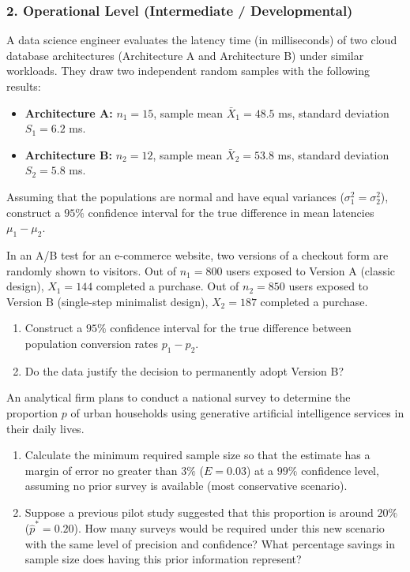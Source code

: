 \subsubsection*{2. Operational Level (Intermediate / Developmental)}

\begin{problema}
	\label{prob:dif_medias_indep_iguales}
	A data science engineer evaluates the latency time (in milliseconds) of two cloud database architectures (Architecture A and Architecture B) under similar workloads. They draw two independent random samples with the following results:
	\begin{itemize}
		\item \textbf{Architecture A:} $n_1 = 15$, sample mean $\bar{X}_1 = 48.5$ ms, standard deviation $S_1 = 6.2$ ms.
		\item \textbf{Architecture B:} $n_2 = 12$, sample mean $\bar{X}_2 = 53.8$ ms, standard deviation $S_2 = 5.8$ ms.
	\end{itemize}
	Assuming that the populations are normal and have equal variances ($\sigma_1^2 = \sigma_2^2$), construct a $95\%$ confidence interval for the true difference in mean latencies $\mu_1 - \mu_2$.
\end{problema}

\begin{problema}
	\label{prob:dif_proporciones_ab}
	In an A/B test for an e-commerce website, two versions of a checkout form are randomly shown to visitors. Out of $n_1 = 800$ users exposed to Version A (classic design), $X_1 = 144$ completed a purchase. Out of $n_2 = 850$ users exposed to Version B (single-step minimalist design), $X_2 = 187$ completed a purchase.
	\begin{enumerate}
		\item Construct a $95\%$ confidence interval for the true difference between population conversion rates $p_1 - p_2$.
		\item Do the data justify the decision to permanently adopt Version B?
	\end{enumerate}
\end{problema}

\begin{problema}
	\label{prob:n_proporcion}
	An analytical firm plans to conduct a national survey to determine the proportion $p$ of urban households using generative artificial intelligence services in their daily lives.
	\begin{enumerate}
		\item Calculate the minimum required sample size so that the estimate has a margin of error no greater than $3\%$ ($E = 0.03$) at a $99\%$ confidence level, assuming no prior survey is available (most conservative scenario).
		\item Suppose a previous pilot study suggested that this proportion is around $20\%$ ($\hat{p}^* = 0.20$). How many surveys would be required under this new scenario with the same level of precision and confidence? What percentage savings in sample size does having this prior information represent?
	\end{enumerate}
\end{problema}

